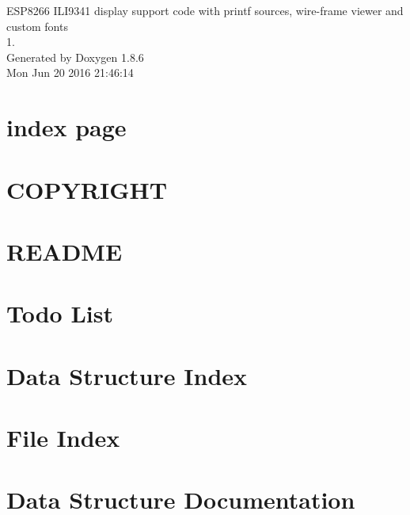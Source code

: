 \documentclass[twoside]{book}
\newcommand{\clearemptydoublepage}{%
  \newpage{\pagestyle{empty}\cleardoublepage}%
}
\begin{document}
\hypersetup{pageanchor=false}
\begin{titlepage}
\vspace*{7cm}
\begin{center}%
{\Large E\-S\-P8266 I\-L\-I9341 display support code with printf sources, wire-\/frame viewer and custom fonts \\[1ex]\large 1. }\\
\vspace*{1cm}
{\large Generated by Doxygen 1.8.6}\\
\vspace*{0.5cm}
{\small Mon Jun 20 2016 21:46:14}\\
\end{center}
\end{titlepage}
\clearemptydoublepage
\tableofcontents
\clearemptydoublepage
{}
\hypersetup{pageanchor=true}

\chapter{index page}
\label{index}\hypertarget{index}{}
\chapter{C\-O\-P\-Y\-R\-I\-G\-H\-T}
\label{md_COPYRIGHT}
\hypertarget{md_COPYRIGHT}{}

\chapter{R\-E\-A\-D\-M\-E}
\label{md_README}
\hypertarget{md_README}{}

\chapter{Todo List}
\label{todo}
\hypertarget{todo}{}

\chapter{Data Structure Index}

\chapter{File Index}

\chapter{Data Structure Documentation}
































\end{document}
